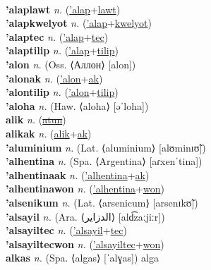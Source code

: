  \label{'alapak} \\
\textbf{'alaplawt} \textit{n.} (\hyperref['alap]{'alap}+\hyperref[lawt]{lawt})
 \label{'alaplawt} \\
\textbf{'alapkwelyot} \textit{n.} (\hyperref['alap]{'alap}+\hyperref[kwelyot]{kwelyot})
 \label{'alapkwelyot} \\
\textbf{'alaptec} \textit{n.} (\hyperref['alap]{'alap}+\hyperref[tec]{tec})
 \label{'alaptec} \\
\textbf{'alaptilip} \textit{n.} (\hyperref['alap]{'alap}+\hyperref[tilip]{tilip})
 \label{'alaptilip} \\
\textbf{'alon} \textit{n.} (Oss. ⟨Аллон⟩ [alon])
 \label{'alon} \\
\textbf{'alonak} \textit{n.} (\hyperref['alon]{'alon}+\hyperref[ak]{ak})
 \label{'alonak} \\
\textbf{'alontilip} \textit{n.} (\hyperref['alon]{'alon}+\hyperref[tilip]{tilip})
 \label{'alontilip} \\
\textbf{'aloha} \textit{n.} (Haw. ⟨aloha⟩ [əˈloha])
 \label{'aloha} \\
\textbf{alik} \textit{n.} (\hyperref[atun]{\sout{atun}})
 \label{alik} \\
\textbf{alikak} \textit{n.} (\hyperref[alik]{alik}+\hyperref[ak]{ak})
 \label{alikak} \\
\textbf{'aluminium} \textit{n.} (Lat. ⟨aluminium⟩ [alʊminɪʊ̃])
 \label{'aluminium} \\
\textbf{'alhentina} \textit{n.} (Spa. ⟨Argentina⟩ [aɾxenˈtina])
 \label{'alhentina} \\
\textbf{'alhentinaak} \textit{n.} (\hyperref['alhentina]{'alhentina}+\hyperref[ak]{ak})
 \label{'alhentinaak} \\
\textbf{'alhentinawon} \textit{n.} (\hyperref['alhentina]{'alhentina}+\hyperref[won]{won})
 \label{'alhentinawon} \\
\textbf{'alsenikum} \textit{n.} (Lat. ⟨arsenicum⟩ [arsenɪkʊ̃])
 \label{'alsenikum} \\
\textbf{'alsayil} \textit{n.} (Ara. ⟨الدزاير⟩ [ald͡zaːjiːr])
 \label{'alsayil} \\
\textbf{'alsayiltec} \textit{n.} (\hyperref['alsayil]{'alsayil}+\hyperref[tec]{tec})
 \label{'alsayiltec} \\
\textbf{'alsayiltecwon} \textit{n.} (\hyperref['alsayiltec]{'alsayiltec}+\hyperref[won]{won})
 \label{'alsayiltecwon} \\
\textbf{alkas} \textit{n.} (Spa. ⟨algas⟩ [ˈalɣas])
alga \label{alkas} \\
